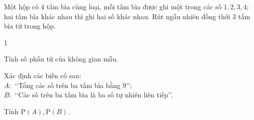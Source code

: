 \begin{bt}%
	Một hộp có $4$ tấm bìa cùng loại, mỗi tấm bìa được ghi một trong các số $1,2,3,4$; hai tấm bìa khác nhau thì ghi hai số khác nhau. Rút ngẫu nhiên đồng thời $3$ tấm bìa từ trong hộp.
	\begin{enumEX}[a)]{1}
		\item Tính số phần tử của không gian mẫu.
		\item Xác định các biến cố sau:\\
		$A\colon$ \lq\lq Tổng các số trên ba tấm bìa bằng $9$\rq\rq;\\
		$B\colon$ \lq\lq Các số trên ba tấm bìa là ba số tự nhiên liên tiếp\rq\rq.
		\item Tính $\mathrm{P}(A), \mathrm{P}(B)$.
	\end{enumEX}
\end{bt}

